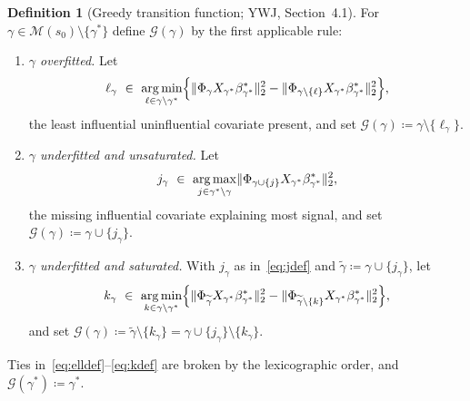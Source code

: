 \documentclass[aos]{imsart}
\DeclarePairedDelimiter{\norm}{\lVert}{\rVert}
\newcommand{\signal}{X_{\gamma^{\ast}}\beta^{\ast}_{\gamma^{\ast}}}
\theoremstyle{plain}
\theoremstyle{definition}
\newtheorem{definition}{Definition}[section]
\begin{document}
    \begin{definition}[Greedy transition function; YWJ, Section~4.1]
        \label{def:G}
        For $\gamma\in\mathscr{M}(s_0)\setminus\{\gamma^{\ast}\}$ define
        $\mathcal{G}(\gamma)$ by the first applicable rule:
        \begin{enumerate}[label=(G\arabic*),leftmargin=3.4em]
            \item\label{G:del} \emph{$\gamma$ overfitted.} Let
            \begin{equation}
                \label{eq:elldef}
                \ell_\gamma\ \in\ \operatorname*{arg\,min}
                _{\ell\in\gamma\setminus\gamma^{\ast}}
                \Bigl\{\norm{\Phi_\gamma\signal}_2^{2}
                -\norm{\Phi_{\gamma\setminus\{\ell\}}\signal}_2^{2}
                \Bigr\},
            \end{equation}
            the least influential uninfluential covariate present, and set
            $\mathcal{G}(\gamma)\coloneq\gamma\setminus\{\ell_\gamma\}$.
            \item\label{G:add} \emph{$\gamma$ underfitted and unsaturated.}
            Let
            \begin{equation}
                \label{eq:jdef}
                j_\gamma\ \in\ \operatorname*{arg\,max}
                _{j\in\gamma^{\ast}\setminus\gamma}
                \norm{\Phi_{\gamma\cup\{j\}}\signal}_2^{2},
            \end{equation}
            the missing influential covariate explaining most signal, and set
            $\mathcal{G}(\gamma)\coloneq\gamma\cup\{j_\gamma\}$.
            \item\label{G:exch} \emph{$\gamma$ underfitted and saturated.}
            With $j_\gamma$ as in~\eqref{eq:jdef} and
            $\widetilde\gamma\coloneq\gamma\cup\{j_\gamma\}$, let
            \begin{equation}
                \label{eq:kdef}
                k_\gamma\ \in\ \operatorname*{arg\,min}
                _{k\in\gamma\setminus\gamma^{\ast}}
                \Bigl\{\norm{\Phi_{\widetilde\gamma}\signal}_2^{2}
                -\norm{\Phi_{\widetilde\gamma\setminus\{k\}}\signal}_2^{2}
                \Bigr\},
            \end{equation}
            and set
            $\mathcal{G}(\gamma)\coloneq
            \widetilde\gamma\setminus\{k_\gamma\}
            =\gamma\cup\{j_\gamma\}\setminus\{k_\gamma\}$.
        \end{enumerate}
        Ties in~\eqref{eq:elldef}--\eqref{eq:kdef} are broken by the
        lexicographic order, and
        $\mathcal{G}(\gamma^{\ast})\coloneq\gamma^{\ast}$.
    \end{definition}
\end{document}
